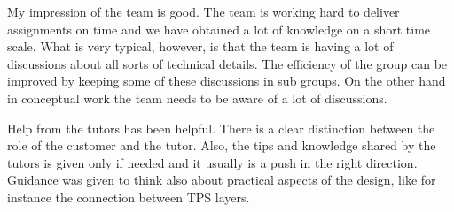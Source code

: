 My impression of the team is good. The team is working hard to deliver assignments on time and we have obtained a lot of knowledge on a short time scale. What is very typical, however, is that the team is having a lot of discussions about all sorts of technical details. The efficiency of the group can be improved by keeping some of these discussions in sub groups. On the other hand in conceptual work the team needs to be aware of a lot of discussions.

Help from the tutors has been helpful. There is a clear distinction between the role of the customer and the tutor. Also, the tips and knowledge shared by the tutors is given only if needed and it usually is a push in the right direction. Guidance was given to think also about practical aspects of the design, like for instance the connection between TPS layers.
